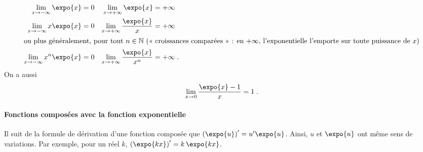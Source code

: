       \begin{thm}
            \begin{align*}
                  \lim_{x\rightarrow-\infty} \expo{x} & = 0     & \lim_{x\rightarrow+\infty} \expo{x} & = +\infty \\
                  \lim_{x\rightarrow-\infty} x \expo{x} & = 0   & \lim_{x\rightarrow+\infty} \frac{\expo{x}}{x} & = +\infty \\
                \intertext{ou plus g\'en\'eralement, pour tout $n\in\mathbb{N}$ (<< croissances compar\'ees >> : en $+\infty$, l'exponentielle l'emporte sur toute puissance de $x$)}
                  \lim_{x\rightarrow-\infty} x^n \expo{x} & = 0 & \lim_{x\rightarrow+\infty} \frac{\expo{x}}{x^n} & = +\infty\;.
            \end{align*}
            On a aussi 
                  \[
                        \lim_{x\rightarrow 0} \frac{\expo{x}-1}{x} = 1      \;.
                  \]
      \end{thm}
      \paragraph{Fonctions compos\'ees avec la fonction exponentielle}
            Il suit de la formule de d\'erivation d'une fonction compos\'ee que 
            $\left( \expo{u} \right)' = u' \expo{u}$.
            Ainsi, $u$ et $\expo{u}$ ont m\^eme sens de variations.
            Par exemple, pour un r\'eel $k$, $\left(\expo{kx}\right)' = k\,\expo{kx}$.
